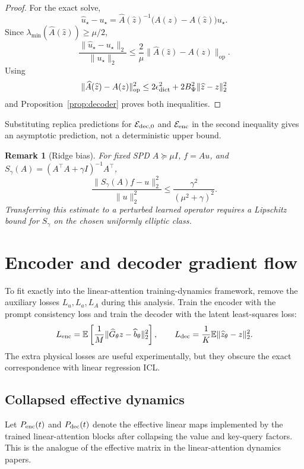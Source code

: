 \documentclass[11pt,a4paper]{article}
\newtheorem{remark}{Remark}
\theoremstyle{definition}
\newcommand{\E}{\mathbb E}
\newcommand{\op}{\mathrm{op}}
\newcommand{\wh}{\widehat}
\newcommand{\calE}{\mathcal E}
\begin{document}
\begin{proof}
For the exact solve,
\[
    \wh u_\star-u_\star
    =
    \wh A(\wh z)^{-1}
    \bigl(A(z)-\wh A(\wh z)\bigr)u_\star .
\]
Since $\lambda_{\min}(\wh A(\wh z))\ge\mu/2$,
\[
    \frac{\|\wh u_\star-u_\star\|_2}{\|u_\star\|_2}
    \le
    \frac{2}{\mu}\|\wh A(\wh z)-A(z)\|_{\op}.
\]
Using
\[
    \|\wh A(\wh z)-A(z)\|_{\op}^2
    \le
    2\epsilon_{\rm dict}^2
    +
    2B_\Psi^2\|\wh z-z\|_2^2
\]
and Proposition~\ref{prop:decoder} proves both inequalities.
\end{proof}

Substituting replica predictions for \(\calE_{\rm dec,0}\) and
\(\calE_{\rm enc}\) in the second inequality gives an asymptotic prediction,
not a deterministic upper bound.

\begin{remark}[Ridge bias]
For fixed SPD \(A\succeq\mu I\), \(f=Au\), and
\(S_\gamma(A)=(A^\top A+\gamma I)^{-1}A^\top\),
\[
 \frac{\|S_\gamma(A)f-u\|_2^2}{\|u\|_2^2}
 \le \frac{\gamma^2}{(\mu^2+\gamma)^2}.
\]
Transferring this estimate to a perturbed learned operator requires a
Lipschitz bound for \(S_\gamma\) on the chosen uniformly elliptic class.
\end{remark}

\section{Encoder and decoder gradient flow}

To fit exactly into the linear-attention training-dynamics framework, remove
the auxiliary losses $L_u,L_a,L_A$ during this analysis.  Train the encoder
with the prompt consistency loss and train the decoder with the latent
least-squares loss:
\[
    L_{\rm enc}
    =
    \E\left[
        \frac1M\|\wh G_\theta z-\wh b_\theta\|_2^2
    \right],
    \qquad
    L_{\rm dec}
    =
    \frac1K\E\|\wh z_\theta-z\|_2^2 .
\]
The extra physical losses are useful experimentally, but they obscure the
exact correspondence with linear regression ICL.

\subsection{Collapsed effective dynamics}

Let $P_{\rm enc}(t)$ and $P_{\rm dec}(t)$ denote the effective linear maps
implemented by the trained linear-attention blocks after collapsing the value
and key-query factors.  This is the analogue of the effective matrix in the
linear-attention dynamics papers.
\end{document}
